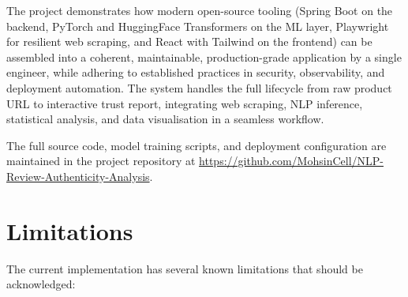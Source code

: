 \documentclass[12pt,a4paper,oneside]{report}
\begin{document}
The project demonstrates how modern open-source tooling (Spring Boot
on the backend, PyTorch and HuggingFace Transformers on the ML layer,
Playwright for resilient web scraping, and React with Tailwind on the
frontend) can be assembled into a coherent, maintainable,
production-grade application by a single engineer, while adhering to
established practices in security, observability, and deployment
automation. The system handles the full lifecycle from raw product URL
to interactive trust report, integrating web scraping, NLP inference,
statistical analysis, and data visualisation in a seamless workflow.

The full source code, model training scripts, and deployment
configuration are maintained in the project repository at
\url{https://github.com/MohsinCell/NLP-Review-Authenticity-Analysis}.

\section{Limitations}
The current implementation has several known limitations that should be
acknowledged:
\end{document}
